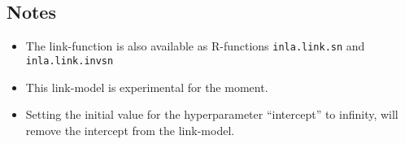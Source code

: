 \documentclass[a4paper,11pt]{article}
\begin{document}
\begin{verbatim}
\end{verbatim}

\subsection*{Notes}

\begin{itemize}
\item The link-function is also available as R-functions
    \texttt{inla.link.sn} and \texttt{inla.link.invsn}
\item This link-model is experimental for the moment.
\item Setting the initial value for the hyperparameter ``intercept''
    to infinity, will remove the intercept from the link-model.
\end{itemize}
\end{document}
